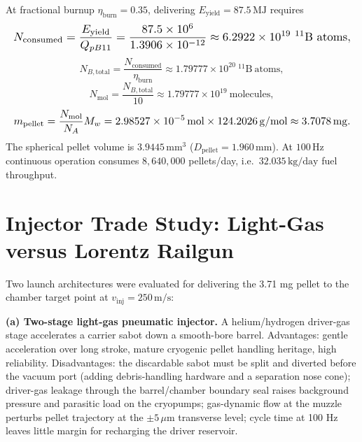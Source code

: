 \documentclass[10pt,journal,compsoc]{IEEEtran}
\newcommand{\mm}{\,\mathrm{mm}}
\newcommand{\MJ}{\,\mathrm{MJ}}
\begin{document}
At fractional burnup $\eta_{\mathrm{burn}} = 0.35$, delivering
$E_{\mathrm{yield}} = 87.5\MJ$ requires
\begin{equation}\resizebox{\columnwidth}{!}{$\displaystyle
N_{\mathrm{consumed}} = \frac{E_{\mathrm{yield}}}{Q_{pB11}}
 = \frac{87.5\times10^{6}}{1.3906\times10^{-12}}
 \approx 6.2922\times10^{19}\ \mathrm{^{11}B\ atoms},
$}\end{equation}
\begin{equation}
N_{B,\mathrm{total}} = \frac{N_{\mathrm{consumed}}}{\eta_{\mathrm{burn}}}
 \approx 1.79777\times10^{20}\ \mathrm{^{11}B\ atoms},
\end{equation}
\begin{equation}
N_{\mathrm{mol}} = \frac{N_{B,\mathrm{total}}}{10}
 \approx 1.79777\times10^{19}\ \mathrm{molecules},
\end{equation}
\begin{equation}\resizebox{\columnwidth}{!}{$\displaystyle
m_{\mathrm{pellet}} = \frac{N_{\mathrm{mol}}}{N_A}M_w
 = 2.98527\times10^{-5}\,\mathrm{mol}\times124.2026\,\mathrm{g/mol}
 \approx 3.7078\,\mathrm{mg}.
$}\end{equation}
The spherical pellet volume is $3.9445\,\mathrm{mm^3}$
($D_{\mathrm{pellet}} = 1.960\mm$). At $100\,\mathrm{Hz}$ continuous
operation consumes $8{,}640{,}000$ pellets/day,
i.e.\ $32.035\,\mathrm{kg/day}$ fuel throughput.

\section{Injector Trade Study: Light-Gas versus Lorentz Railgun}
\label{sec:injector}
Two launch architectures were evaluated for delivering the 3.71 mg pellet
to the chamber target point at $v_{\mathrm{inj}} = 250\,\mathrm{m/s}$:

\textbf{(a) Two-stage light-gas pneumatic injector.} A helium/hydrogen
driver-gas stage accelerates a carrier sabot down a smooth-bore barrel.
Advantages: gentle acceleration over long stroke, mature cryogenic pellet
handling heritage, high reliability. Disadvantages: the discardable sabot
must be split and diverted before the vacuum port (adding debris-handling
hardware and a separation nose cone); driver-gas leakage through the
barrel/chamber boundary seal raises background pressure and parasitic load
on the cryopumps; gas-dynamic flow at the muzzle perturbs pellet
trajectory at the $\pm5\,\mu\mathrm{m}$ transverse level; cycle time at
100 Hz leaves little margin for recharging the driver reservoir.
\end{document}
